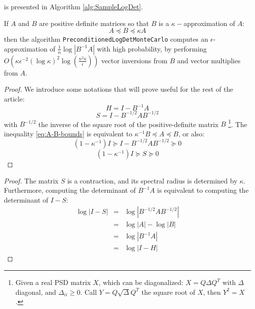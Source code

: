 is presented in Algorithm \ref{alg:SampleLogDet}. \begin{corollary}
\label{cor:preconditioning}If $A$ and $B$ are positive definite
matrices so that $B$ is a $\kappa-$approximation of $A$: 
\begin{equation}
A\preceq B\preceq\kappa A\label{eq:A-B-bounds}
\end{equation}
then the algorithm \texttt{PreconditionedLogDetMonteCarlo} computes
an $\epsilon$-approximation of $\frac{1}{n}\log\left|B^{-1}A\right|$
with high probability, by performing $O\left(\kappa\epsilon^{-2}\left(\log\kappa\right)^{2}\log\left(\frac{n^{2}\kappa}{\epsilon}\right)\right)$
vector inversions from $B$ and vector multiplies from $A$. \begin{proof}
We introduce some notations that will prove useful for the rest of
the article: 
\[
H=I-B^{-1}A
\]
\[
S=I-B^{-1/2}AB^{-1/2}
\]
with $B^{-1/2}$ the inverse of the square root of the positive-definite
matrix $B$%
\footnote{Given a real PSD matrix $X$, which can be diagonalized: $X=Q\Delta Q^{T}$
with $\Delta$ diagonal, and $\Delta_{ii}\geq0$. Call $Y=Q\sqrt{\Delta}Q^{T}$
the square root of $X$, then $Y^{2}=X$.%
}. The inequality \ref{eq:A-B-bounds} is equivalent to $\kappa^{-1}B\preceq A\preceq B$,
or also: 
\[
\left(1-\kappa^{-1}\right)I\succeq I-B^{-1/2}AB^{-1/2}\succeq0
\]
\[
\left(1-\kappa^{-1}\right)I\succeq S\succeq0
\]


\end{proof} \end{corollary} \begin{proof} The matrix $S$ is a
contraction, and its spectral radius is determined by $\kappa$. Furthermore,
computing the determinant of $B^{-1}A$ is equivalent to computing
the determinant of $I-S$: 
\begin{eqnarray*}
\log\left|I-S\right| & = & \log\left|B^{-1/2}AB^{-1/2}\right|\\
 & = & \log\left|A\right|-\log\left|B\right|\\
 & = & \log\left|B^{-1}A\right|\\
 & = & \log\left|I-H\right|
\end{eqnarray*}



\end{proof}
